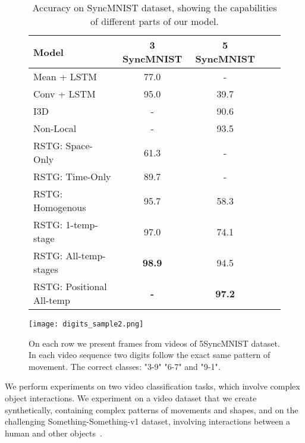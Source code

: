 \documentclass{article}
\begin{document}
\begin{figure}
    \begin{minipage}{.65\textwidth}
    \begin{table}[H]
    \label{tab:results_digits}
    \fontsize{9}{10}\selectfont
\caption{Accuracy on SyncMNIST dataset, showing the capabilities of different parts of our model. }
       \begin{tabular}{lcccr}
            \toprule
            Model & 3 SyncMNIST  & 5 SyncMNIST & \\
            \midrule
            \midrule
            Mean + LSTM    &  77.0 & - \\
            Conv + LSTM  &  95.0 & 39.7 \\
            I3D & - & 90.6 \\
            Non-Local & - & 93.5 \\
            \midrule
            RSTG: Space-Only & 61.3 & - \\
            RSTG: Time-Only & 89.7 & - \\
            RSTG: Homogenous & 95.7 & 58.3\\
            RSTG: 1-temp-stage    & 97.0 & 74.1\\
            RSTG: All-temp-stages & \textbf{98.9} & 94.5 \\
            RSTG: Positional All-temp & \textbf{-} & \textbf{97.2} \\
            \bottomrule
        \end{tabular}
            \end{table}
    \end{minipage}
    \begin{minipage}{.35\textwidth}
        \centering
        \vspace{3mm}
        \texttt{[image: digits\_sample2.png]}
        
        \caption{On each row we present frames from videos of 5SyncMNIST dataset. In each video sequence two digits follow the exact same pattern of movement. The correct classes: "3-9" "6-7" and "9-1".}\label{fig:digits}
    \end{minipage} 
\end{figure}

We perform experiments on two video classification tasks, which involve complex object interactions. We experiment on a video dataset that we create synthetically, containing complex patterns of movements and shapes, and on the challenging Something-Something-v1 dataset, involving interactions between a human and other objects~\cite{goyal2017something}. 
\end{document}
